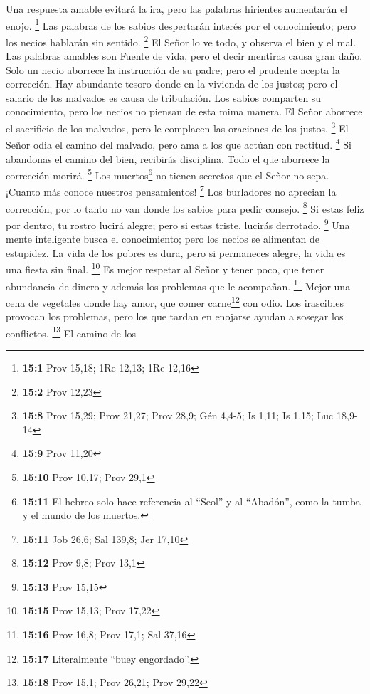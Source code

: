  Una respuesta amable evitará la ira, pero las palabras
hirientes aumentarán el enojo. \footnote{\textbf{15:1} Prov 15,18; 1Re
  12,13; 1Re 12,16}  Las palabras de los sabios
despertarán interés por el conocimiento; pero los necios hablarán sin
sentido. \footnote{\textbf{15:2} Prov 12,23}  El Señor lo
ve todo, y observa el bien y el mal.  Las palabras amables
son Fuente de vida, pero el decir mentiras causa gran daño.
 Solo un necio aborrece la instrucción de su padre; pero
el prudente acepta la corrección.  Hay abundante tesoro
donde en la vivienda de los justos; pero el salario de los malvados es
causa de tribulación.  Los sabios comparten su
conocimiento, pero los necios no piensan de esta mima manera.
 El Señor aborrece el sacrificio de los malvados, pero le
complacen las oraciones de los justos. \footnote{\textbf{15:8} Prov
  15,29; Prov 21,27; Prov 28,9; Gén 4,4-5; Is 1,11; Is 1,15; Luc 18,9-14}
 El Señor odia el camino del malvado, pero ama a los que
actúan con rectitud. \footnote{\textbf{15:9} Prov 11,20} 
Si abandonas el camino del bien, recibirás disciplina. Todo el que
aborrece la corrección morirá. \footnote{\textbf{15:10} Prov 10,17; Prov
  29,1}  Los muertos\footnote{\textbf{15:11} El hebreo
  solo hace referencia al ``Seol'' y al ``Abadón'', como la tumba y el
  mundo de los muertos.} no tienen secretos que el Señor no sepa.
¡Cuanto más conoce nuestros pensamientos! \footnote{\textbf{15:11} Job
  26,6; Sal 139,8; Jer 17,10}  Los burladores no aprecian
la corrección, por lo tanto no van donde los sabios para pedir consejo.
\footnote{\textbf{15:12} Prov 9,8; Prov 13,1}  Si estas
feliz por dentro, tu rostro lucirá alegre; pero si estas triste, lucirás
derrotado. \footnote{\textbf{15:13} Prov 15,15}  Una
mente inteligente busca el conocimiento; pero los necios se alimentan de
estupidez.  La vida de los pobres es dura, pero si
permaneces alegre, la vida es una fiesta sin final. \footnote{\textbf{15:15}
  Prov 15,13; Prov 17,22}  Es mejor respetar al Señor y
tener poco, que tener abundancia de dinero y además los problemas que le
acompañan. \footnote{\textbf{15:16} Prov 16,8; Prov 17,1; Sal 37,16}
 Mejor una cena de vegetales donde hay amor, que comer
carne\footnote{\textbf{15:17} Literalmente ``buey engordado''.} con
odio.  Los irascibles provocan los problemas, pero los
que tardan en enojarse ayudan a sosegar los conflictos. \footnote{\textbf{15:18}
  Prov 15,1; Prov 26,21; Prov 29,22}  El camino de los
